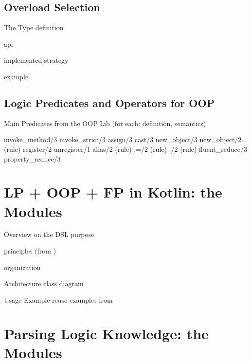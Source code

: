 \documentclass[handout]{beamer}
\begin{document}
\subsection{Overload Selection}

\begin{frame}[allowframebreaks]{The  Type}
    definition

    api

    implemented strategy

    example
\end{frame}

\subsection{Logic Predicates and Operators for OOP}

\begin{frame}[allowframebreaks]{Main Predicates from the OOP Lib}
    (for each: definition, semantics)

    \ttfamily
    invoke\_method/3
    invoke\_strict/3
    assign/3
    cast/3
    new\_object/3
    new\_object/2 (rule)
    register/2
    unregister/1
    alias/2 (rule)
    :=/2 (rule)
    ./2 (rule)
    fluent\_reduce/3
    property\_reduce/3
\end{frame}

\section{LP + OOP + FP in Kotlin: the  Modules}

\begin{frame}[allowframebreaks]{Overview on the DSL}
    purpose

    principles (from \cite{kotlinDSl4PrologWoa2020})

    organization
\end{frame}

\begin{frame}[allowframebreaks]{Architecture}
    class diagram
\end{frame}

\begin{frame}[allowframebreaks]{Usage Example}
    reuse examples from \cite{kotlinDSl4PrologWoa2020}
\end{frame}

\section{Parsing Logic Knowledge: the  Modules}
\end{document}
